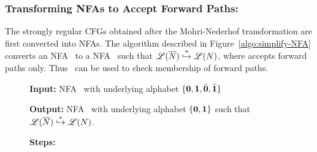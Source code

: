 \documentclass[9pt]{sigplanconf}
\newcommand{\comment}[1]{{\color{Myblue}{(#1)}}}
\begin{document}
\begin{enumerate}
\subsubsection{Transforming NFAs to Accept Forward Paths:}
The strongly regular CFGs obtained after the Mohri-Nederhof
transformation are
  first converted  into  NFAs.  The        algorithm         described        in
Figure~\ref{algo:simplify-NFA} converts  an NFA \ntbar\  to a NFA
\nt\ such that  $\mathscr{L}({\overline{N}}) \stackrel{*}{\hookrightarrow}
\mathscr{L}({N})$, where {\nt} accepts forward paths only.
\comment{Rewrite the algorithm to handle \cbar and update the example automata}
Thus  \nt\  can  be  used  to  check  
membership of forward paths.

\begin{figure*}[t]
\begin{boxedminipage}{\textwidth}
\begin{center}
  \raggedright  {\bf  Input:}  NFA \ntbar\  with  underlying
  alphabet $\lbrace \mathbf{0}, \mathbf{1}, \bar{\mathbf{0}}, \bar{\mathbf{1}}\rbrace$ \\
%
  \raggedright{\bf Output:} NFA  \nt\ with  underlying
  alphabet $\lbrace \mathbf{0}, \mathbf{1} \rbrace$ such that
  $\mathscr{L}({\overline{N}}) \stackrel{*}{\hookrightarrow} \mathscr{L}({N})$.
  \\
%  
  
  \raggedright{\bf Steps:}


   


\end{center}
\end{boxedminipage}
\end{figure*}
\end{enumerate}
\end{document}
